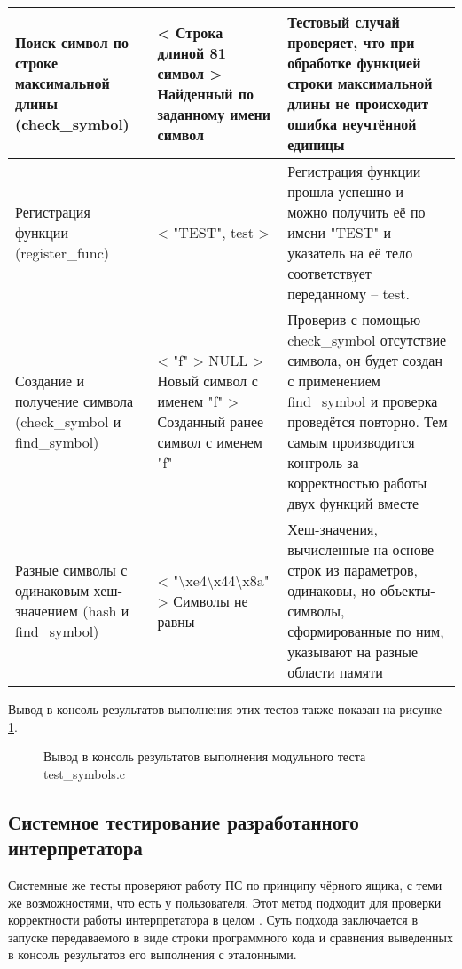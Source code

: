 \begin{xltabular}{\textwidth}{|p{4cm}|p{4cm}|X|}
	Поиск символ по строке максимальной длины (check\_symbol) & < Строка длиной 81 символ \linebreak > Найденный по заданному имени символ & Тестовый случай проверяет, что при обработке функцией строки максимальной длины не происходит ошибка неучтённой единицы \\ \hline
	Регистрация функции (register\_func) & < "TEST", test \linebreak > & Регистрация функции прошла успешно и можно получить её по имени "TEST" и указатель на её тело соответствует переданному -- test. \\ \hline
	Создание и получение символа (check\_symbol и find\_symbol) & < "f" \linebreak > NULL \linebreak > Новый символ с именем "f" \linebreak > Созданный ранее символ с именем "f" & Проверив с помощью check\_symbol отсутствие символа, он будет создан с применением find\_symbol и проверка проведётся повторно. Тем самым производится контроль за корректностью работы двух функций вместе \\ \hline
	Разные символы с одинаковым хеш-значением (hash и find\_symbol)& <     "\textbackslash xe4\textbackslash x44\textbackslash x8a" \linebreak > Символы не равны & Хеш-значения, вычисленные на основе строк из параметров, одинаковы, но объекты-символы, сформированные по ним, указывают на разные области памяти
\end{xltabular}

Вывод в консоль результатов выполнения этих тестов также показан на рисунке \ref{modul_test_res:image}.
\begin{figure}[ht]
	\caption{Вывод в консоль результатов выполнения модульного теста test\_symbols.c}
	\label{modul_test_res:image}
\end{figure}

\subsection{Системное тестирование разработанного интерпретатора}

Системные же тесты проверяют работу ПС по принципу чёрного ящика, с теми же возможностями, что есть у пользователя. Этот метод подходит для проверки корректности работы интерпретатора в целом \cite{e15}. Суть подхода заключается в запуске передаваемого в виде строки программного кода и сравнения выведенных в консоль результатов его выполнения с эталонными.

